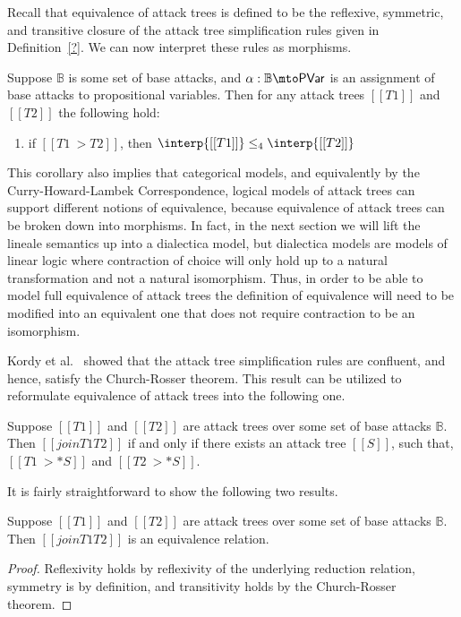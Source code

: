 Recall that equivalence of attack trees is defined to be the
reflexive, symmetric, and transitive closure of the attack tree
simplification rules given in Definition~\ref{?}.  We can now
interpret these rules as morphisms.
\begin{corollary}
  \label{corollary:attack_trees_rewrites_mor_lineale}
  Suppose $\mathbb{B}$ is some set of base attacks, and $\alpha :
  \mathbb{B} \mto \mathsf{PVar}$ is an assignment of base attacks to
  propositional variables.  Then for any attack trees $[[T1]]$ and
  $[[T2]]$ the following hold:
  \begin{enumerate}[label=\roman*.]
  \item if $[[T1 ~> T2]]$, then $\interp{[[T1]]} \leq_4 \interp{[[T2]]}$
  \end{enumerate}
\end{corollary}
This corollary also implies that categorical models, and equivalently
by the Curry-Howard-Lambek Correspondence, logical models of attack
trees can support different notions of equivalence, because
equivalence of attack trees can be broken down into morphisms.  In
fact, in the next section we will lift the lineale semantics up into a
dialectica model, but dialectica models are models of linear logic
where contraction of choice will only hold up to a natural
transformation and not a natural isomorphism.  Thus, in order to be
able to model full equivalence of attack trees the definition of
equivalence will need to be modified into an equivalent one that does
not require contraction to be an isomorphism.

Kordy et al.~\cite{Kordy2017} showed that the attack tree
simplification rules are confluent, and hence, satisfy the
Church-Rosser theorem.  This result can be utilized to reformulate
equivalence of attack trees into the following one.
\begin{definition}
  \label{def:join-eq-atrees}
  Suppose $[[T1]]$ and $[[T2]]$ are attack trees over some set of base
  attacks $\mathbb{B}$. Then $[[join T1 T2]]$ if and only if there
  exists an attack tree $[[S]]$, such that, $[[T1 ~>* S]]$ and $[[T2 ~>*
      S]]$.
\end{definition}
It is fairly straightforward to show the following two results.
\begin{lemma}
  \label{lemma:joinability_is_an_equivalence_relation}
  Suppose $[[T1]]$ and $[[T2]]$ are attack trees over some set of base
  attacks $\mathbb{B}$. Then $[[join T1 T2]]$ is an equivalence
  relation.
\end{lemma}
\begin{proof}
  Reflexivity holds by reflexivity of the underlying reduction
  relation, symmetry is by definition, and transitivity holds by the
  Church-Rosser theorem.
\end{proof}

